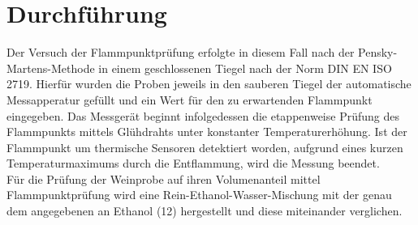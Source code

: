 \newpage
\section{Durchführung}
\label{sec:durchfuerung}

Der Versuch der Flammpunktprüfung erfolgte in diesem Fall nach der \linebreak Pensky-Martens-Methode in einem geschlossenen Tiegel nach der Norm DIN EN ISO 2719.\linebreak
Hierfür wurden die Proben jeweils in den sauberen Tiegel der automatische Messapperatur gefüllt und ein Wert für den zu erwartenden Flammpunkt eingegeben. Das Messgerät beginnt infolgedessen die etappenweise Prüfung des Flammpunkts mittels Glühdrahts unter konstanter Temperaturerhöhung. Ist der Flammpunkt um thermische Sensoren detektiert worden, aufgrund eines kurzen Temperaturmaximums durch die Entflammung, wird die Messung beendet.\\
Für die Prüfung der Weinprobe auf ihren Volumenanteil mittel Flammpunktprüfung wird eine 
Rein-Ethanol-Wasser-Mischung mit der genau dem angegebenen an Ethanol (\SI{12}{\volp}) hergestellt und diese miteinander verglichen.
